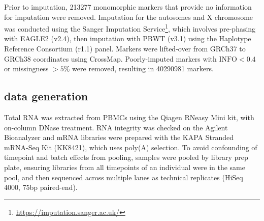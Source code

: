 Prior to imputation, 213277 monomorphic markers that provide no information for imputation were removed.
Imputation for the autosomes and X chromosome was conducted using the Sanger Imputation Service\footnote{\url{https://imputation.sanger.ac.uk/}}, which involves pre-phasing with EAGLE2 (v2.4), then imputation with PBWT (v3.1) using the Haplotype Reference Consortium (r1.1) panel.
Markers were lifted-over from GRCh37 to GRCh38 coordinates using CrossMap.
Poorly-imputed markers with $\text{INFO} < 0.4$ or missingness $> 5\%$ were removed, resulting in 40290981 markers.

\subsection{ data generation}

Total RNA was extracted from \glspl{PBMC} using the Qiagen RNeasy Mini kit, with on-column DNase treatment.
RNA integrity was checked on the Agilent Bioanalyzer and mRNA libraries were prepared with the KAPA Stranded mRNA-Seq Kit (KK8421), which uses poly(A) selection.
To avoid confounding of timepoint and batch effects from pooling, samples were pooled by library prep plate, ensuring libraries from all timepoints of an individual were in the same pool, and then sequenced across multiple lanes as technical replicates (HiSeq 4000, 75bp paired-end).

